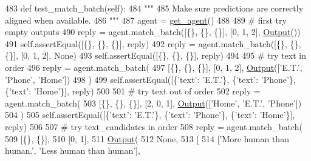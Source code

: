 \begin{DoxyCode}
483     \textcolor{keyword}{def }test\_match\_batch(self):
484         \textcolor{stringliteral}{"""}
485 \textcolor{stringliteral}{        Make sure predictions are correctly aligned when available.}
486 \textcolor{stringliteral}{        """}
487         agent = \hyperlink{namespacetests_1_1test__torch__agent_ae929d109305aaea29fbfa13ecf1f32e9}{get\_agent}()
488 
489         \textcolor{comment}{# first try empty outputs}
490         reply = agent.match\_batch([\{\}, \{\}, \{\}], [0, 1, 2], \hyperlink{namespaceparlai_1_1agents_1_1legacy__agents_1_1seq2seq_1_1torch__agent__v1_a2689006ea97d09413fb242f984bd8016}{Output}())
491         self.assertEqual([\{\}, \{\}, \{\}], reply)
492         reply = agent.match\_batch([\{\}, \{\}, \{\}], [0, 1, 2], \textcolor{keywordtype}{None})
493         self.assertEqual([\{\}, \{\}, \{\}], reply)
494 
495         \textcolor{comment}{# try text in order}
496         reply = agent.match\_batch(
497             [\{\}, \{\}, \{\}], [0, 1, 2], \hyperlink{namespaceparlai_1_1agents_1_1legacy__agents_1_1seq2seq_1_1torch__agent__v1_a2689006ea97d09413fb242f984bd8016}{Output}([\textcolor{stringliteral}{'E.T.'}, \textcolor{stringliteral}{'Phone'}, \textcolor{stringliteral}{'Home'}])
498         )
499         self.assertEqual([\{\textcolor{stringliteral}{'text'}: \textcolor{stringliteral}{'E.T.'}\}, \{\textcolor{stringliteral}{'text'}: \textcolor{stringliteral}{'Phone'}\}, \{\textcolor{stringliteral}{'text'}: \textcolor{stringliteral}{'Home'}\}], reply)
500 
501         \textcolor{comment}{# try text out of order}
502         reply = agent.match\_batch(
503             [\{\}, \{\}, \{\}], [2, 0, 1], \hyperlink{namespaceparlai_1_1agents_1_1legacy__agents_1_1seq2seq_1_1torch__agent__v1_a2689006ea97d09413fb242f984bd8016}{Output}([\textcolor{stringliteral}{'Home'}, \textcolor{stringliteral}{'E.T.'}, \textcolor{stringliteral}{'Phone'}])
504         )
505         self.assertEqual([\{\textcolor{stringliteral}{'text'}: \textcolor{stringliteral}{'E.T.'}\}, \{\textcolor{stringliteral}{'text'}: \textcolor{stringliteral}{'Phone'}\}, \{\textcolor{stringliteral}{'text'}: \textcolor{stringliteral}{'Home'}\}], reply)
506 
507         \textcolor{comment}{# try text\_candidates in order}
508         reply = agent.match\_batch(
509             [\{\}, \{\}],
510             [0, 1],
511             \hyperlink{namespaceparlai_1_1agents_1_1legacy__agents_1_1seq2seq_1_1torch__agent__v1_a2689006ea97d09413fb242f984bd8016}{Output}(
512                 \textcolor{keywordtype}{None},
513                 [
514                     [\textcolor{stringliteral}{'More human than human.'}, \textcolor{stringliteral}{'Less human than human'}],

\end{DoxyCode}
